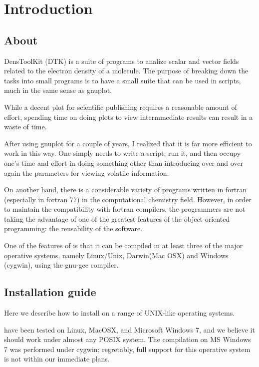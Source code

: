 
\chapter{Introduction}

\section{About \DTK}

DensToolKit (DTK) is a suite of programs to analize scalar and vector fields related to the electron density of a molecule. The purpose of breaking down the tasks into small programs is to have a small suite that can be used in scripts, much in the same sense as gnuplot.

While a decent plot for scientific publishing requires a reasonable amount of effort, spending time on doing plots to view intermmediate results can result in a waste of time.

After using gnuplot for a couple of years, I realized that it is far more efficient to work in this way. One simply needs to write a script, run it, and then occupy one's time and effort in doing something other than introducing over and over again the parameters for viewing volatile information.

On another hand, there is a considerable variety of programs written in fortran (especially in fortran 77) in the computational chemistry field. However, in order to maintain the compatibility with fortran compilers, the programmers are not taking the advantage of one of the greatest features of the object-oriented programming: the reusability of the software. 

One of the features of \DTK{} is that it can be compiled in at least three of the major operative systems, namely Linux/Unix, Darwin(Mac OSX) and Windows (cygwin), using the gnu-gcc compiler.

\section{Installation guide}

Here we describe how to install \DTK{} on a range of UNIX-like operating systems.

\DTK{} have been tested on Linux, MacOSX, and Microsoft Windows 7, and we believe it should work under almost any POSIX system. The compilation on MS Windows 7 was performed under cygwin; regretably, full support for this operative system is not within our immediate plans.


